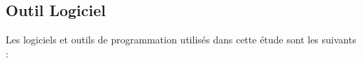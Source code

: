 \subsection{Outil Logiciel}
Les logiciels et outils de programmation utilisés dans cette étude sont les suivants :\\

